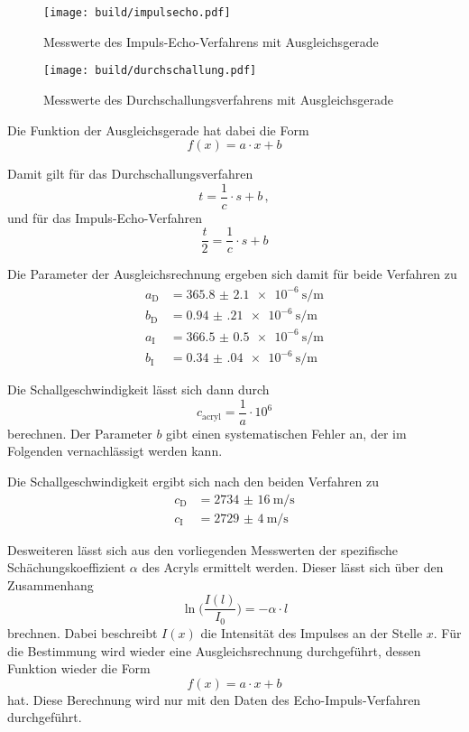 \begin{figure}
    \centering
    \texttt{[image: build/impulsecho.pdf]}
    \caption{Messwerte des Impuls-Echo-Verfahrens mit Ausgleichsgerade}
    \label{fig:imp}
\end{figure}

\begin{figure}
    \centering
    \texttt{[image: build/durchschallung.pdf]}
    \caption{Messwerte des Durchschallungsverfahrens mit Ausgleichsgerade}
    \label{fig:durch}
\end{figure}

Die Funktion der Ausgleichsgerade hat dabei die Form 
\begin{equation}
    f(x) = a\cdot x + b 
\end{equation}

Damit gilt für das Durchschallungsverfahren 
\begin{equation}
    t = \frac{1}{c}\cdot s + b\,,
\end{equation}
und für das Impuls-Echo-Verfahren
\begin{equation}
    \frac{t}{2} = \frac{1}{c}\cdot s + b
\end{equation}

Die Parameter der Ausgleichsrechnung ergeben sich damit für beide Verfahren zu 
\begin{align}
    a_\text{D} &= \SI{365.8(21)e-6}{\s\per\m} \\
    b_\text{D} &= \SI{0.94(21)e-6}{\s\per\m} \\
    a_\text{I} &= \SI{366.5(05)e-6}{\s\per\m} \\
    b_\text{I} &= \SI{0.34(04)e-6}{\s\per\m} 
\end{align}

Die Schallgeschwindigkeit lässt sich dann durch 
\begin{equation}
    c_\text{acryl} = \frac{1}{a}\cdot 10^6
\end{equation}
berechnen. Der Parameter $b$ gibt einen systematischen Fehler an, der im Folgenden vernachlässigt werden kann. 

Die Schallgeschwindigkeit ergibt sich nach den beiden Verfahren zu 
\begin{align}
    c_\text{D} &= \SI{2734(16)}{\m\per\s} \\
    c_\text{I} &= \SI{2729(4)}{\m\per\s}
\end{align}

Desweiteren lässt sich aus den vorliegenden Messwerten der spezifische Schächungskoeffizient $\alpha$ des Acryls ermittelt 
werden. Dieser lässt sich über den Zusammenhang 
\begin{equation}
    \ln{\bigl(\frac{I(l)}{I_0}\bigr)} = - \alpha \cdot l
\end{equation}
brechnen. Dabei beschreibt $I(x)$ die Intensität des Impulses an der Stelle $x$. Für die Bestimmung wird wieder eine Ausgleichsrechnung
durchgeführt, dessen Funktion wieder die Form 
\begin{equation}
    f(x) = a\cdot x + b 
\end{equation}  
hat. Diese Berechnung wird nur mit den Daten des Echo-Impuls-Verfahren durchgeführt.

